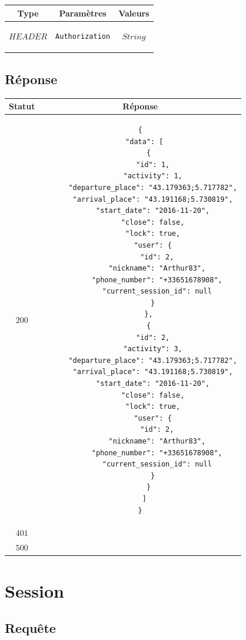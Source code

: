 \documentclass[titlepage, 12pt]{report}
\begin{document}
\begin{center}
	\begin{tabular}{|c|c|c|}
	\hline
	Type & Paramètres & Valeurs \\
	\hline
	$ HEADER $ & 
	\begin{lstlisting}
Authorization
	\end{lstlisting} &
	$ String $ \\ \hline
	
	\end{tabular}
\end{center}

\subsection{Réponse}

\begin{center}
	\begin{tabular}{|c|c|}
		\hline
		Statut & Réponse \\
		\hline
		$ 200 $ & \begin{lstlisting}
{
  "data": [
    {
      "id": 1,
      "activity": 1,
      "departure_place": "43.179363;5.717782",
      "arrival_place": "43.191168;5.730819",
      "start_date": "2016-11-20",
      "close": false,
      "lock": true,
      "user": {
        "id": 2,
        "nickname": "Arthur83",
        "phone_number": "+33651678908",
        "current_session_id": null
      }
    },
    {
      "id": 2,
      "activity": 3,
      "departure_place": "43.179363;5.717782",
      "arrival_place": "43.191168;5.730819",
      "start_date": "2016-11-20",
      "close": false,
      "lock": true,
      "user": {
        "id": 2,
        "nickname": "Arthur83",
        "phone_number": "+33651678908",
        "current_session_id": null
      }
    }
  ]
}
		\end{lstlisting} \\ 
		\hline
		$ 401 $ & \\
		\hline
		$ 500 $ & \\
		\hline
	\end{tabular}
\end{center}

%
%

\section{Session}

\subsection{Requête}
\end{document}
